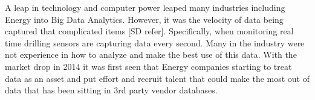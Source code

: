 \documentclass{llncs}
\begin{document}
A leap in technology and computer power leaped many industries including Energy into Big Data Analytics. However, it was the velocity of data being captured that complicated items [SD refer]. Specifically, when monitoring real time drilling sensors are capturing data every second.  Many in the industry were not experience in how to analyze and make the best use of this data.  With the market drop in 2014 it was first seen that Energy companies starting to treat data as an asset and put effort and recruit talent that could make the most out of data that has been sitting in 3rd party vendor databases.

%
%
%
 
 

\end{document}
